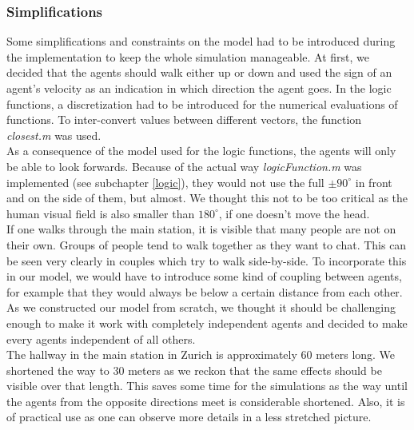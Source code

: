 \subsubsection{Simplifications}
Some simplifications and constraints on the model had to be introduced during the implementation to keep the whole simulation manageable. At first, we decided that the agents should walk either up or down and used the sign of an agent's velocity as an indication in which direction the agent goes. In the logic functions, a discretization had to be introduced for the numerical evaluations of functions. To inter-convert values between different vectors, the function \textit{closest.m} was used.\\
\noi As a consequence of the model used for the logic functions, the agents will only be able to look forwards. Because of the actual way \textit{logicFunction.m} was implemented (see subchapter \ref{logic}), they would not use the full $\pm 90^\circ$ in front and on the side of them, but almost. We thought this not to be too critical as the human visual field is also smaller than $180^\circ$, if one doesn't move the head.\\
\noi If one walks through the main station, it is visible that many people are not on their own. Groups of people tend to walk together as they want to chat. This can be seen very clearly in couples which try to walk side-by-side. To incorporate this in our model, we would have to introduce some kind of coupling between agents, for example that they would always be below a certain distance from each other. As we constructed our model from scratch, we thought it should be challenging enough to make it work with completely independent agents and decided to make every agents independent of all others.\\
\noi The hallway in the main station in Zurich is approximately 60 meters long. We shortened the way to 30 meters as we reckon that the same effects should be visible over that length. This saves some time for the simulations as the way until the agents from the opposite directions meet is considerable shortened. Also, it is of practical use as one can observe more details in a less stretched picture.

